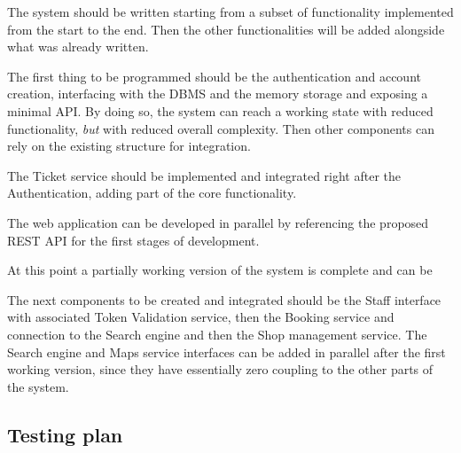 The system should be written starting from a subset of functionality implemented from the start to the end. Then the other functionalities will be added alongside what was already written.

The first thing to be programmed should be the authentication and account creation, interfacing with the DBMS and the memory storage and exposing a minimal API. By doing so, the system can reach a working state with reduced functionality, \emph{but } with reduced overall complexity. Then other components can rely on the existing structure for integration.

The Ticket service should be implemented and integrated right after the Authentication, adding part of the core functionality.

The web application can be developed in parallel by referencing the proposed REST API for the first stages of development.

At this point a partially working version of the system is complete and can be 

The next components to be created and integrated should be the Staff interface with associated Token Validation service, then the Booking service and connection to the Search engine and then the Shop management service. The Search engine and Maps service  interfaces can be added in parallel after the first working version, since they have essentially zero coupling to the other parts of the system.

\subsection{Testing plan}
